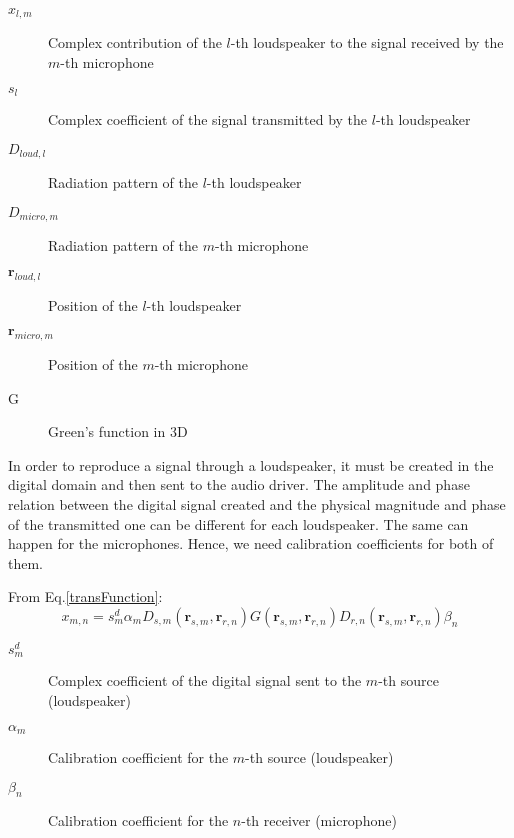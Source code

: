 \begin{description}
	\item[$x_{l,m}$] Complex contribution of the $l$-th loudspeaker to the signal received by the $m$-th microphone
	\item[$s_{l}$] Complex coefficient of the signal transmitted by the $l$-th loudspeaker
	\item[$D_{loud,l}$] Radiation pattern of the $l$-th loudspeaker
	\item[$D_{micro,m}$] Radiation pattern of the $m$-th microphone
	\item[$\mathbf{r}_{loud,l}$] Position of the $l$-th loudspeaker
	\item[$\mathbf{r}_{micro,m}$] Position of the $m$-th microphone
	\item[G] Green's function in 3D
\end{description}

In order to reproduce a signal through a loudspeaker, it must be created in the digital domain and then sent to the audio driver. The amplitude and phase relation between the digital signal created and the physical magnitude and phase of the transmitted one can be different for each loudspeaker. The same can happen for the microphones. Hence, we need calibration coefficients for both of them.

From Eq.\ref{transFunction}:
\begin{equation}
x_{m,n} = s_{m}^d \alpha_m D_{s,m}(\mathbf{r}_{s,m}, \mathbf{r}_{r,n}) G(\mathbf{r}_{s,m}, \mathbf{r}_{r,n}) D_{r,n}(\mathbf{r}_{s,m}, \mathbf{r}_{r,n}) \beta_n
\label{transEquationCalibration}
\end{equation}

\begin{description}
	\item[$s_{m}^d$] Complex coefficient of the digital signal sent to the $m$-th source (loudspeaker)
	\item[$\alpha_m$] Calibration coefficient for the $m$-th source (loudspeaker)
	\item[$\beta_n$] Calibration coefficient for the $n$-th receiver (microphone)
\end{description}
